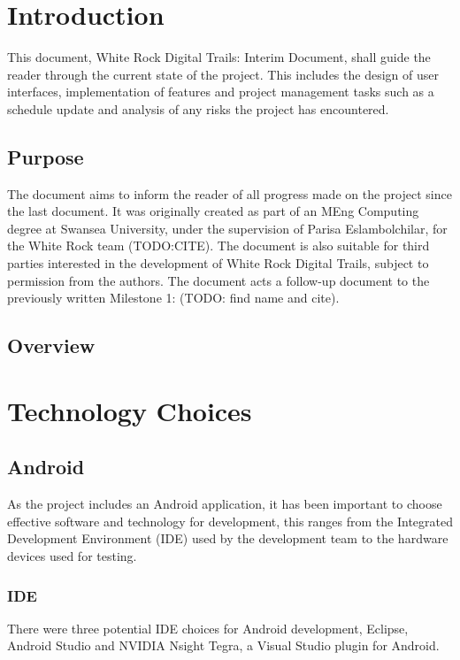 \documentclass[11pt,a4paper]{article}
\begin{document}


\newpage 

\tableofcontents

\newpage
\section{Introduction}
This document, White Rock Digital Trails: Interim Document, shall guide the reader through the current state of the project. This includes the design of user interfaces, implementation of features and project management tasks such as a schedule update and analysis of any risks the project has encountered.
\subsection{Purpose}
The document aims to inform the reader of all progress made on the project since the last document. It was originally created as part of an MEng Computing degree at Swansea University, under the supervision of Parisa Eslambolchilar, for the White Rock team (TODO:CITE). The document is also suitable for third parties interested in the development of White Rock Digital Trails, subject to permission from the authors. The document acts a follow-up document to the previously written Milestone 1: (TODO: find name and cite).
\subsection{Overview}

\section{Technology Choices}
\subsection{Android}
As the project includes an Android application, it has been important to choose effective software and technology for development, this ranges from the Integrated Development Environment (IDE) used by the development team to the hardware devices used for testing.

\subsubsection{IDE}
There were three potential IDE choices for Android development, Eclipse, Android Studio and NVIDIA Nsight Tegra, a Visual Studio plugin for Android.
\end{document}
